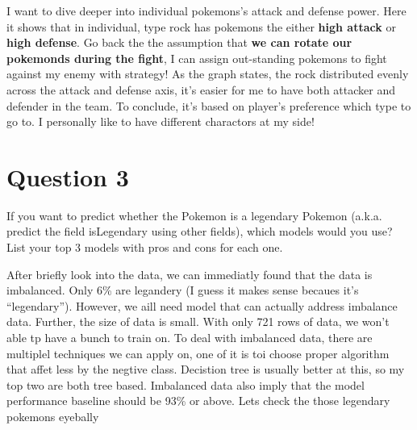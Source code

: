 \documentclass[11pt]{article}
\begin{document}
I want to dive deeper into individual pokemons's attack and defense
power. Here it shows that in individual, type rock has pokemons the
either \textbf{high attack} or \textbf{high defense}. Go back the the
assumption that \textbf{we can rotate our pokemonds during the fight}, I
can assign out-standing pokemons to fight against my enemy with
strategy! As the graph states, the rock distributed evenly across the
attack and defense axis, it's easier for me to have both attacker and
defender in the team. To conclude, it's based on player's preference
which type to go to. I personally like to have different charactors at
my side! 

    \hypertarget{question-3}{%
\section{Question 3}\label{question-3}}

If you want to predict whether the Pokemon is a legendary Pokemon
(a.k.a. predict the field isLegendary using other fields), which models
would you use? List your top 3 models with pros and cons for each one.

After briefly look into the data, we can immediatly found that the data
is imbalanced. Only 6\% are legandery (I guess it makes sense becaues
it's ``legendary''). However, we aill need model that can actually
address imbalance data. Further, the size of data is small. With only
721 rows of data, we won't able tp have a bunch to train on. To deal
with imbalanced data, there are multiplel techniques we can apply on,
one of it is toi choose proper algorithm that affet less by the negtive
class. Decistion tree is usually better at this, so my top two are both
tree based. Imbalanced data also imply that the model performance
baseline should be 93\% or above. Lets check the those legendary
pokemons eyebally
\end{document}
